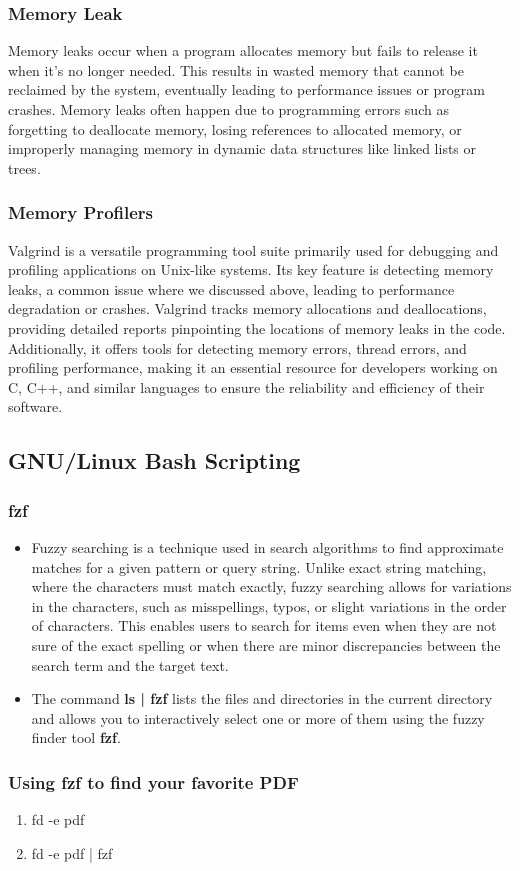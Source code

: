 \documentclass[titlepage]{article}
\begin{document}
\subsubsection{Memory Leak}

Memory leaks occur when a program allocates memory but fails to release it when it's no longer needed. This results in wasted memory that cannot be reclaimed by the system, eventually leading to performance issues or program crashes. Memory leaks often happen due to programming errors such as forgetting to deallocate memory, losing references to allocated memory, or improperly managing memory in dynamic data structures like linked lists or trees.

\subsubsection{Memory Profilers}
Valgrind is a versatile programming tool suite primarily used for debugging and profiling applications on Unix-like systems. Its key feature is detecting memory leaks, a common issue where we discussed above, leading to performance degradation or crashes. Valgrind tracks memory allocations and deallocations, providing detailed reports pinpointing the locations of memory leaks in the code. Additionally, it offers tools for detecting memory errors, thread errors, and profiling performance, making it an essential resource for developers working on C, C++, and similar languages to ensure the reliability and efficiency of their software.

\subsection{GNU/Linux Bash Scripting}
\subsubsection{fzf}
\begin{itemize}
\item Fuzzy searching is a technique used in search algorithms to find approximate matches for a given pattern or query string. Unlike exact string matching, where the characters must match exactly, fuzzy searching allows for variations in the characters, such as misspellings, typos, or slight variations in the order of characters. This enables users to search for items even when they are not sure of the exact spelling or when there are minor discrepancies between the search term and the target text.

\item  The command \textbf{ls | fzf } lists the files and directories in the current directory and allows you to interactively select one or more of them using the fuzzy finder tool \textbf {fzf}.
\end{itemize}

\subsubsection{Using fzf to find your favorite PDF}
\begin{enumerate}
\item fd -e pdf

\item fd -e pdf | fzf
\end{enumerate}
\end{document}
